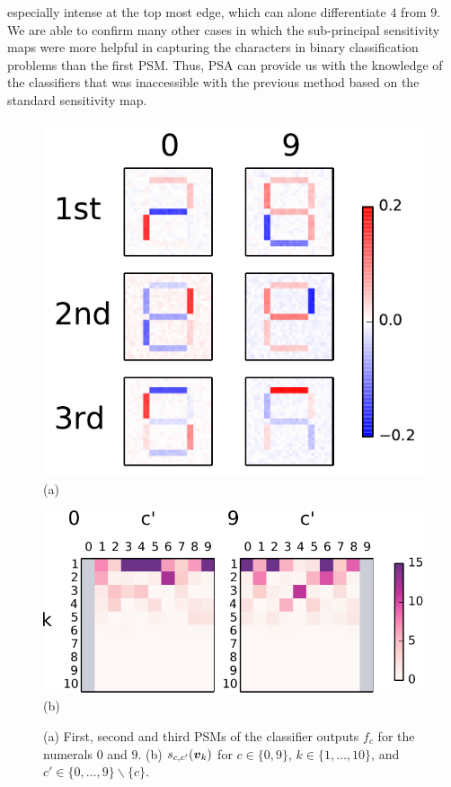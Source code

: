 especially intense at the top most edge, which can alone differentiate $4$ from $9$.
%
We are able to confirm many other cases in which the sub-principal sensitivity maps were
more helpful in capturing the characters in binary classification problems than the first PSM.
%
Thus, PSA can provide us with the knowledge of the classifiers
that was inaccessible with the previous method based on the standard
sensitivity map.
\begin{figure}[htbp]
\centering
 \begin{minipage}[t]{0.35\columnwidth}
  \centering
   \includegraphics[clip, width=1.\columnwidth]{./fig/fig3a.pdf}
  \hspace{1.6cm} \textsf{(a)}
  \end{minipage}
 \begin{minipage}[t]{0.6\columnwidth}
  \centering
   \includegraphics[clip, width=1.\columnwidth]{./fig/fig3b_modified.pdf}
  \hspace{1.6cm} \textsf{(b)}
 \end{minipage}
  \label{fig:digit09}
 \caption{(a) First, second and third PSMs of the classifier outputs $f_c$ for the numerals
 $0$ and $9$. (b) $s_{c, c'}(\mbox{\boldmath $v$}_{k})$ for $c \in \{0, 9\}$, $k \in
 \{1, \dots, 10\}$, and $c' \in \{0, \dots, 9\} \backslash \{c\}$.}
\end{figure}

